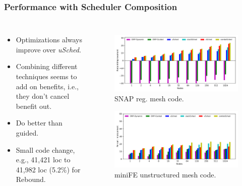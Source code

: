 \begin{frame}[label=perfComp]
\frametitle{Performance with Scheduler Composition} 
\vspace*{-0.13in}
\begin{columns}
\begin{itemize}
\small \item \small Optimizations always improve over \textit{uSched}. 
\item \small Combining different techniques seems to add on benefits, i.e., they don't cancel benefit out. 
\item \small Do better than guided. 
\item \small Small code change, e.g., 41,421 loc to 41,982 loc (5.2\%) for Rebound. 
\end{itemize}
\begin{figure}[ht] 
\begin{center} 
\includegraphics[scale=0.18]{./plots/app-scaling-strat-SNAP-fastNUMA2}\\
\vspace*{-0.16in}
{\tiny SNAP reg. mesh code.}
\end{center}

\begin{center}
\includegraphics[scale=0.18]{./plots/app-scaling-strat-fe-fastNUMA2}\\
\vspace*{-0.16in}
{\tiny miniFE unstructured mesh code.}
\end{center}


\end{figure}
\end{columns}
\end{frame}
